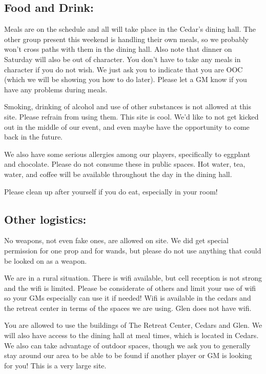 \documentclass[green]{GL2020}
\begin{document}
\subsection*{Food and Drink:}

Meals are on the schedule and all will take place in the Cedar’s dining hall.  The other group present this weekend is handling their own meals, so we probably won't cross paths with them in the dining hall.  Also note that dinner on Saturday will also be out of character.  You don’t have to take any meals in character if you do not wish.  We just ask you to indicate that you are OOC (which we will be showing you how to do later).  Please let a GM know if you have any problems during meals.

Smoking, drinking of alcohol and use of other substances is not allowed at this site.  Please refrain from using them. This site is cool. We'd like to not get kicked out in the middle of our event, and even maybe have the opportunity to come back in the future.

We also have some serious allergies among our players, specifically to eggplant and chocolate.  Please do not consume these in public spaces.   Hot water, tea, water, and coffee will be available throughout the day in the dining hall.

Please clean up after yourself if you do eat, especially in your room!

\subsection*{Other logistics:}

No weapons, not even fake ones, are allowed on site.  We did get special permission for one prop and for wands, but please do not use anything that could be looked on as a weapon.

We are in a rural situation.  There is wifi available, but cell reception is not strong and the wifi is limited.  Please be considerate of others and limit your use of wifi so your GMs especially can use it if needed!  Wifi is available in the cedars and the retreat center in terms of the spaces we are using.  Glen does not have wifi.

You are allowed to use the buildings of The Retreat Center, Cedars and Glen.  We will also have access to the dining hall at meal times, which is located in Cedars.  We also can take advantage of outdoor spaces, though we ask you to generally stay around our area to be able to be found if another player or GM is looking for you!  This is a very large site.
\end{document}
